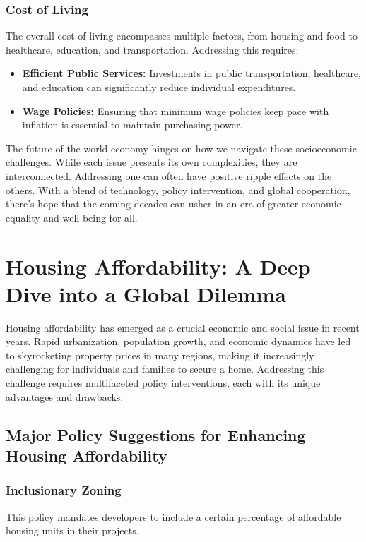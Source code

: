 \subsubsection*{Cost of Living}
The overall cost of living encompasses multiple factors, from housing and food to healthcare, education, and transportation. Addressing this requires:
\begin{itemize}
    \item \textbf{Efficient Public Services:} Investments in public transportation, healthcare, and education can significantly reduce individual expenditures.
    \item \textbf{Wage Policies:} Ensuring that minimum wage policies keep pace with inflation is essential to maintain purchasing power.
\end{itemize}

The future of the world economy hinges on how we navigate these socioeconomic challenges. While each issue presents its own complexities, they are interconnected. Addressing one can often have positive ripple effects on the others. With a blend of technology, policy intervention, and global cooperation, there's hope that the coming decades can usher in an era of greater economic equality and well-being for all.

\section*{Housing Affordability: A Deep Dive into a Global Dilemma}

Housing affordability has emerged as a crucial economic and social issue in recent years. Rapid urbanization, population growth, and economic dynamics have led to skyrocketing property prices in many regions, making it increasingly challenging for individuals and families to secure a home. Addressing this challenge requires multifaceted policy interventions, each with its unique advantages and drawbacks.

\subsection*{Major Policy Suggestions for Enhancing Housing Affordability}

\subsubsection*{Inclusionary Zoning}
This policy mandates developers to include a certain percentage of affordable housing units in their projects.

